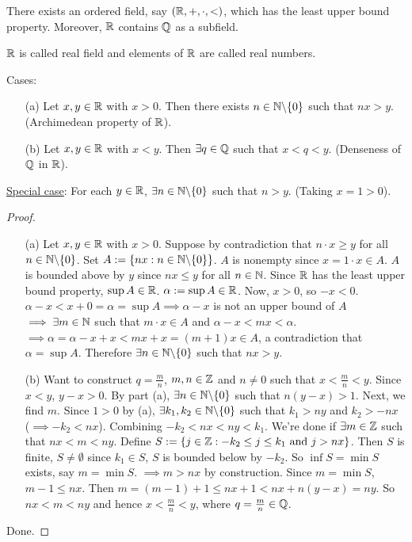 \documentclass[]{article}
\begin{document}
\begin{theorem}
	 There exists an ordered field, say $(\mathbb{R},+,\cdot,<)$, which has the least upper bound property. Moreover, $\mathbb{R}$ contains $\mathbb{Q}$ as a subfield.
\end{theorem}
\begin{note}
	$\mathbb{R}$ is called real field and elements of $\mathbb{R}$ are called real numbers.
\end{note}

\begin{theorem}
	Cases:
	\begin{enumerate}
		\item[(a)] Let $x,y\in\mathbb{R}$ with $x>0$. Then there exists $n\in\mathbb{N}\backslash\{0\}$ such that $nx>y$. (Archimedean property of $\mathbb{R}$).
		\item[(b)] Let $x,y\in\mathbb{R}$ with $x<y$. Then $\exists q\in\mathbb{Q}$ such that $x<q<y$. (Denseness of $\mathbb{Q}$ in $\mathbb{R}$).
	\end{enumerate}
	\ul{Special case}: For each $y\in\mathbb{R}$, $\exists n\in\mathbb{N}\backslash \{0\}$ such that $n>y$. (Taking $x=1>0$).
\end{theorem}
\begin{proof}
	\begin{enumerate}
		\item[(a)] Let $x,y\in\mathbb{R}$ with $x>0$. Suppose by contradiction that $n\cdot x \geq y$ for all $n\in\mathbb{N}\backslash\{0\}$. Set $A:=\{nx:n\in\mathbb{N}\backslash\{0\}\}$. $A$ is nonempty since $x = 1\cdot x\in A$. $A$ is bounded above by $y$ since $nx\leq y$ for all $n\in\mathbb{N}$. Since $\mathbb{R}$ has the least upper bound property, $\sup A\in\mathbb{R}$. $\alpha:= \sup A\in\mathbb{R}$. Now, $x>0$, so $-x<0$. $\alpha-x < x+0 = \alpha = \sup A \implies \alpha - x$ is not an upper bound of $A$ $\implies \exists m\in\mathbb{N}$ such that $m\cdot x\in A$ and $\alpha-x<mx<\alpha$. $\implies \alpha= \alpha - x + x < mx + x = (m+1)x\in A$, a contradiction that $\alpha = \sup A$. Therefore $\exists n\in\mathbb{N}\backslash \{0\}$ such that $nx>y$.
		\item[(b)] Want to construct $q = \frac{m}{n}$, $m,n\in\mathbb{Z}$ and $n\neq 0$ such that $x<\frac{m}{n}<y$. Since $x<y$, $y-x>0$. By part (a), $\exists n\in\mathbb{N}\backslash \{0\}$ such that $n(y-x)>1$. Next, we find $m$. Since $1>0$ by (a), $\exists k_1,k_2\in\mathbb{N}\backslash \{0\}$ such that $k_1>ny$ and $k_2>-nx$ ($\implies -k_2<nx$). Combining $-k_2<nx<ny<k_1$. We're done if $\exists m\in\mathbb{Z}$ such that $nx<m<ny$. Define $S:=\{j\in\mathbb{Z}:-k_2\leq j\leq k_1 \text{ and } j>nx\}$. Then $S$ is finite, $S\neq \emptyset$ since $k_1\in S$, $S$ is bounded below by $-k_2$. So $\inf S = \min S$ exists, say $m = \min S$. $\implies m>nx$ by construction. Since $m=\min S$, $m-1 \leq nx$. Then $m = (m-1)+1 \leq nx+1 < nx+n(y-x) = ny$. So $nx<m<ny$ and hence $x<\frac{m}{n}<y$, where $q = \frac{m}{n}\in\mathbb{Q}$.
	\end{enumerate}
	Done.
\end{proof}
\end{document}
